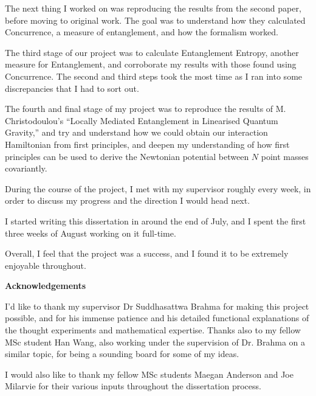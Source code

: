 \documentclass[12pt,a4paper]{report}
\theoremstyle{plain}
\theoremstyle{definition}
\theoremstyle{remark}
\begin{document}
The next thing I worked on was reproducing the results from the second paper, before moving to original work. The goal was to understand how they calculated Concurrence, a measure of entanglement, and how the formalism worked.

The third stage of our project was to calculate Entanglement Entropy, another measure for Entanglement, and corroborate my results with those found using Concurrence. The second and third steps took the most time as I ran into some discrepancies that I had to sort out.

The fourth and final stage of my project was to reproduce the results of M. Christodoulou's ``Locally Mediated Entanglement in Linearised Quantum Gravity,'' and try and understand how we could obtain our interaction Hamiltonian from first principles, and deepen my understanding of how first principles can be used to derive the Newtonian potential between $N$ point masses covariantly.

During the course of the project, I met with my supervisor roughly every week,
in order to discuss my progress and the direction I would head
next.

I started writing this dissertation in around the end of July, and I spent the first
three weeks of August working on it full-time.

Overall, I feel that the project was a success, and I found it to be
extremely enjoyable throughout.


\newpage

\begin{center}
\textbf{Acknowledgements}
\end{center}

I'd like to thank my supervisor Dr Suddhasattwa Brahma for
making this project possible, and for his immense patience and his detailed functional explanations of the thought experiments and mathematical expertise. Thanks also to my fellow MSc student Han Wang, also working under the supervision of Dr. Brahma on a similar topic, for being a sounding board for some of my ideas.

I would also like to thank my fellow MSc students Maegan Anderson and Joe Milarvie for their various inputs throughout the dissertation process.
\end{document}
